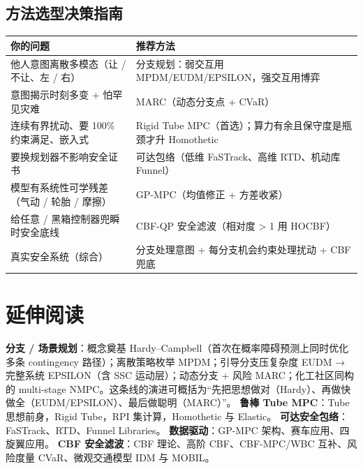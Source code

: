 \subsection*{方法选型决策指南}
\begin{table}[H]\centering\small
\begin{tabular}{p{}p{}}
\toprule
你的问题 & 推荐方法 \\
\midrule
他人意图离散多模态（让 / 不让、左 / 右） & 分支规划：弱交互用 MPDM/EUDM/EPSILON，强交互用博弈 \\
意图揭示时刻多变 + 怕罕见灾难 & MARC（动态分支点 + CVaR） \\
连续有界扰动、要 100\% 约束满足、嵌入式 & Rigid Tube MPC（首选）；算力有余且保守度是瓶颈才升 Homothetic \\
要换规划器不影响安全证书 & 可达包络（低维 FaSTrack、高维 RTD、机动库 Funnel） \\
模型有系统性可学残差（气动 / 轮胎 / 摩擦） & GP-MPC（均值修正 + 方差收紧） \\
给任意 / 黑箱控制器兜瞬时安全底线 & CBF-QP 安全滤波（相对度 > 1 用 HOCBF） \\
真实安全系统（综合） & 分支处理意图 + 每分支机会约束处理扰动 + CBF 兜底 \\
\bottomrule
\end{tabular}
\end{table}

\section*{延伸阅读}

\textbf{分支 / 场景规划}：概念奠基 Hardy--Campbell\cite{hardy2013contingency}（首次在概率障碍预测上同时优化多条 contingency 路径）；离散策略枚举 MPDM\cite{cunningham2015mpdm}；引导分支压复杂度 EUDM\cite{zhang2020eudm} → 完整系统 EPSILON\cite{ding2021epsilon}（含 SSC 运动层\cite{ding2019ssc}）；动态分支 + 风险 MARC\cite{li2023marc}；化工社区同构的 multi-stage NMPC\cite{lucia2013multistage}。这条线的演进可概括为“先把思想做对（Hardy）、再做快做全（EUDM/EPSILON）、最后做聪明（MARC）”。
\textbf{鲁棒 Tube MPC}：Tube 思想前身\cite{langson2004robust}，Rigid Tube\cite{mayne2005tube}，RPI 集计算\cite{rakovic2005invariant}，Homothetic\cite{rakovic2012homothetic} 与 Elastic\cite{rakovic2016elastic}。
\textbf{可达安全包络}：FaSTrack\cite{herbert2017fastrack}、RTD\cite{kousik2020rtd}、Funnel Libraries\cite{majumdar2017funnel}。
\textbf{数据驱动}：GP-MPC 架构\cite{hewing2020gpmpc}、赛车应用\cite{kabzan2019gp}、四旋翼应用\cite{torrente2021gp}。
\textbf{CBF 安全滤波}：CBF 理论\cite{ames2017cbf,ames2019cbf}、高阶 CBF\cite{xiao2022hocbf}、CBF-MPC/WBC 互补\cite{grandia2021cbf}、风险度量 CVaR\cite{rockafellar2000cvar}、微观交通模型 IDM\cite{treiber2000idm} 与 MOBIL\cite{kesting2007mobil}。

